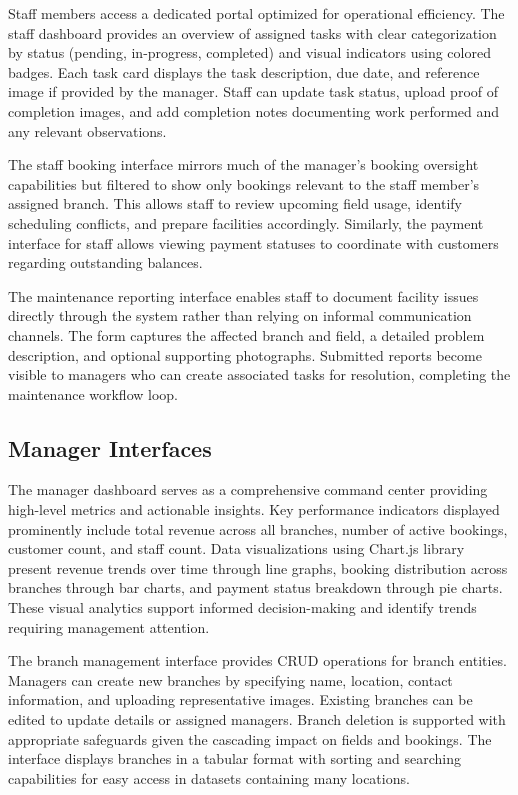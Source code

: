 Staff members access a dedicated portal optimized for operational efficiency. The staff dashboard provides an overview of assigned tasks with clear categorization by status (pending, in-progress, completed) and visual indicators using colored badges. Each task card displays the task description, due date, and reference image if provided by the manager. Staff can update task status, upload proof of completion images, and add completion notes documenting work performed and any relevant observations.

The staff booking interface mirrors much of the manager's booking oversight capabilities but filtered to show only bookings relevant to the staff member's assigned branch. This allows staff to review upcoming field usage, identify scheduling conflicts, and prepare facilities accordingly. Similarly, the payment interface for staff allows viewing payment statuses to coordinate with customers regarding outstanding balances.

The maintenance reporting interface enables staff to document facility issues directly through the system rather than relying on informal communication channels. The form captures the affected branch and field, a detailed problem description, and optional supporting photographs. Submitted reports become visible to managers who can create associated tasks for resolution, completing the maintenance workflow loop.

\subsection{Manager Interfaces}

The manager dashboard serves as a comprehensive command center providing high-level metrics and actionable insights. Key performance indicators displayed prominently include total revenue across all branches, number of active bookings, customer count, and staff count. Data visualizations using Chart.js library present revenue trends over time through line graphs, booking distribution across branches through bar charts, and payment status breakdown through pie charts. These visual analytics support informed decision-making and identify trends requiring management attention.

The branch management interface provides CRUD operations for branch entities. Managers can create new branches by specifying name, location, contact information, and uploading representative images. Existing branches can be edited to update details or assigned managers. Branch deletion is supported with appropriate safeguards given the cascading impact on fields and bookings. The interface displays branches in a tabular format with sorting and searching capabilities for easy access in datasets containing many locations.

